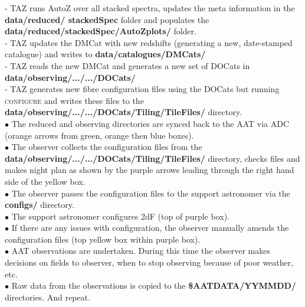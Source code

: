 \documentclass[12pt]{article}
\begin{document}
\hspace{10mm} - TAZ runs AutoZ over all stacked spectra, updates the meta information in the \textbf{data/reduced/ stackedSpec} folder and populates the \textbf{data/reduced/stackedSpec/AutoZplots/} folder. \\

\hspace{10mm} - TAZ updates the DMCat with new redshifts (generating a new, date-stamped catalogue) and writes to  \textbf{data/catalogues/DMCats/} \\

\hspace{10mm} - TAZ reads the new DMCat and generates a new set of DOCats in \textbf{data/observing/.../.../DOCats/}  \\

\hspace{10mm} - TAZ generates new fibre configuration files using the DOCats but running \textsc{configure} and writes these files to the \textbf{data/observing/.../.../DOCats/Tiling/TileFiles/} directory. \\


$\bullet$ The reduced and observing directories are synced back to the AAT via ADC (orange arrows from green, orange then blue boxes).\\

$\bullet$ The observer collects the configuration files from the \textbf{data/observing/.../.../DOCats/Tiling/TileFiles/} directory, checks files and makes night plan as shown by the purple arrows leading through the right hand side of the yellow box.\\ 

$\bullet$ The observer passes the configuration files to the support astronomer via the \textbf{configs/} directory. \\ 

$\bullet$ The support astronomer configures 2dF (top of purple box). \\

$\bullet$ If there are any issues with configuration, the observer manually amends the configuration files (top yellow box within purple box).\\

$\bullet$ AAT observations are undertaken. During this time the observer makes decisions on fields to observer, when to stop observing because of poor weather, etc.  \\

$\bullet$ Raw data from the observations is copied to the \textbf{\$AATDATA/YYMMDD/} directories. And repeat. 
\end{document}
